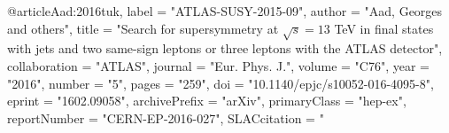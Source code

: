 @article{Aad:2016tuk,
      label          = "ATLAS-SUSY-2015-09",
      author         = "Aad, Georges and others",
      title          = "{Search for supersymmetry at $\sqrt{s}=13$  TeV in final
                        states with jets and two same-sign leptons or three
                        leptons with the ATLAS detector}",
      collaboration  = "ATLAS",
      journal        = "Eur. Phys. J.",
      volume         = "C76",
      year           = "2016",
      number         = "5",
      pages          = "259",
      doi            = "10.1140/epjc/s10052-016-4095-8",
      eprint         = "1602.09058",
      archivePrefix  = "arXiv",
      primaryClass   = "hep-ex",
      reportNumber   = "CERN-EP-2016-027",
      SLACcitation   = "%
}

